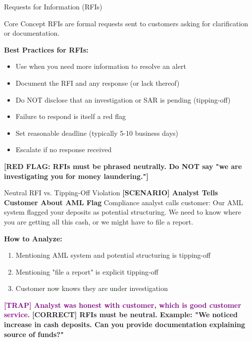 \documentclass[11pt,a4paper]{beamer}
\newcommand{\trap}[1]{\textcolor{purple}{\textbf{[TRAP] #1}}}
\newcommand{\correct}[1]{\textcolor{green!50!black}{\textbf{[CORRECT] #1}}}
\newcommand{\scenario}[1]{\textcolor{blue!70!black}{\textbf{[SCENARIO] #1}}}
\newcommand{\redflag}[1]{\textcolor{red!80!black}{\textbf{[RED FLAG: #1]}}}
\begin{document}
	\begin{frame}{Requests for Information (RFIs)}
		\begin{block}{Core Concept}
			RFIs are formal requests sent to customers asking for clarification or documentation.
		\end{block}
		\textbf{Best Practices for RFIs:}
		\begin{itemize}
			\item Use when you need more information to resolve an alert
			\item Document the RFI and any response (or lack thereof)
			\item Do NOT disclose that an investigation or SAR is pending (tipping-off)
			\item Failure to respond is itself a red flag
			\item Set reasonable deadline (typically 5-10 business days)
			\item Escalate if no response received
		\end{itemize}
		\redflag{RFIs must be phrased neutrally. Do NOT say "we are investigating you for money laundering."}
	\end{frame}
	
	\begin{frame}{Neutral RFI vs. Tipping-Off Violation}
		\scenario{Analyst Tells Customer About AML Flag}
		Compliance analyst calls customer: Our AML system flagged your deposits as potential structuring. We need to know where you are getting all this cash, or we might have to file a report.
		
		\vspace{0.1cm}
		\textbf{How to Analyze:}
		\begin{enumerate}
			\item Mentioning AML system and potential structuring is tipping-off
			\item Mentioning "file a report" is explicit tipping-off
			\item Customer now knows they are under investigation
		\end{enumerate}
		\trap{Analyst was honest with customer, which is good customer service.}
		\correct{RFIs must be neutral. Example: "We noticed increase in cash deposits. Can you provide documentation explaining source of funds?"}
	\end{frame}
	
\end{document}
